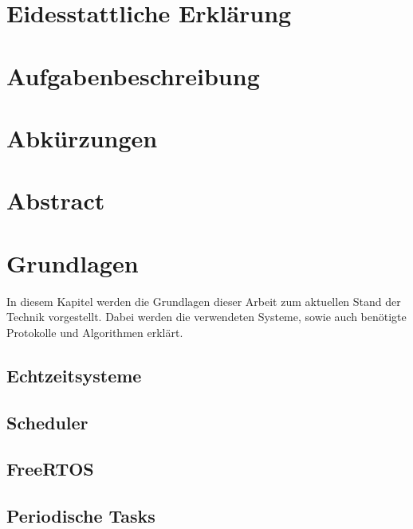 \documentclass{scrartcl}
\begin{document}
	\begin{titlepage}
		
	\end{titlepage}
	\clearpage 
	\section*{Eidesstattliche Erklärung}
		
		\clearpage
	\section*{Aufgabenbeschreibung}
		
		\clearpage
	\tableofcontents
	\clearpage
	\listoffigures
	\listoftables
	\clearpage
	\lstlistoflistings
	\clearpage
	\section*{Abkürzungen}
		
		\clearpage
	\section*{Abstract}
		
	\clearpage
	\section{Grundlagen}
		In diesem Kapitel werden die Grundlagen dieser Arbeit zum aktuellen Stand der Technik vorgestellt.
		Dabei werden die verwendeten Systeme, sowie auch benötigte Protokolle und Algorithmen erklärt.
		\subsection{Echtzeitsysteme} \label{section:echtzeitsysteme}
			
		\subsection{Scheduler} \label{section:scheduler}
			
		\subsection{FreeRTOS} \label{section:freertos}
			
		\subsection{Periodische Tasks} \label{section:periodische_tasks}
			
			\clearpage
\end{document}
